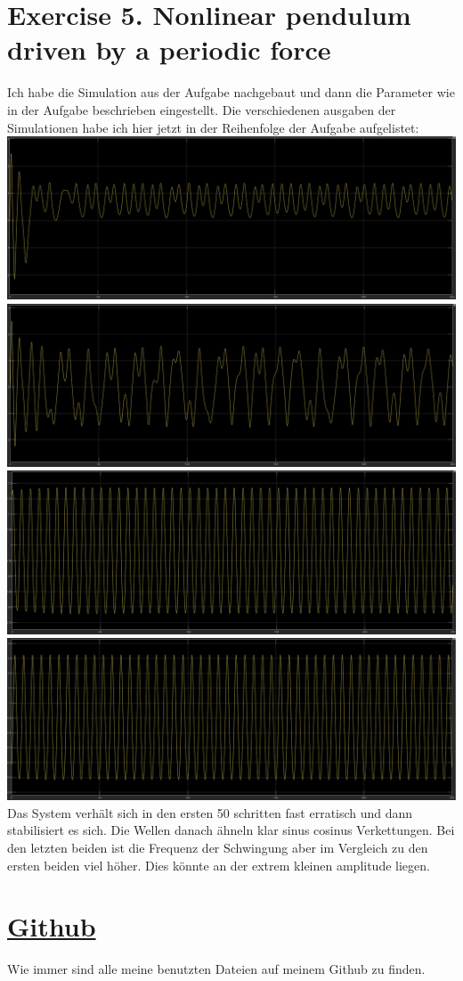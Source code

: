 \documentclass{scrartcl}
\begin{document}
\section*{Exercise 5. Nonlinear pendulum driven by a periodic force}
Ich habe die Simulation aus der Aufgabe nachgebaut und dann die Parameter wie in der Aufgabe beschrieben eingestellt. Die verschiedenen ausgaben der Simulationen habe ich hier jetzt in der Reihenfolge der Aufgabe aufgelistet:\\
\includegraphics[scale=0.3]{nonlinv1.png}\\
\includegraphics[scale=0.3]{nonlinv2.png}\\
\includegraphics[scale=0.3]{nonlinv3.png}\\
\includegraphics[scale=0.3]{nonlinv4.png}\\
Das System verhält sich in den ersten 50 schritten fast erratisch und dann stabilisiert es sich. Die Wellen danach ähneln klar sinus cosinus Verkettungen. Bei den letzten beiden ist die Frequenz der Schwingung aber im Vergleich zu den ersten beiden viel höher. Dies könnte an der extrem kleinen amplitude liegen.\\


\section*{\href{https://github.com/7hands/Angewandte-Modellierung-25-Colmant}{Github}}
Wie immer sind alle meine benutzten Dateien auf meinem Github zu finden.
\end{document}
